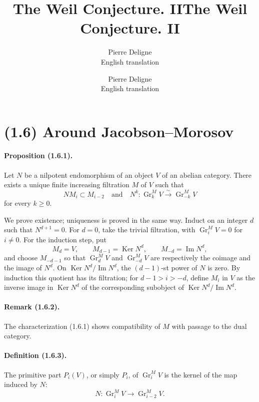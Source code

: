 \documentclass[11pt]{article}
\title{The Weil Conjecture. II}
\author{Pierre Deligne\\\small English translation}
\date{}
\theoremstyle{remark}
\newcommand{\Gr}{\operatorname{Gr}}
\newcommand{\Ker}{\operatorname{Ker}}
\begin{document}
\title{The Weil Conjecture. II}
\author{Pierre Deligne\\\small English translation}
\date{}\maketitle


\section*{(1.6) Around Jacobson--Morosov}

\paragraph{Proposition (1.6.1).} Let $N$ be a nilpotent endomorphism of an object $V$ of an abelian category. There exists a unique finite increasing filtration $M$ of $V$ such that
\[
        NM_i\subset M_{i-2}
        \quad\text{and}\quad
        N^k: \Gr^M_k V \xrightarrow{\sim} \Gr^M_{-k}V
\]
for every $k\ge0$.

We prove existence; uniqueness is proved in the same way. Induct on an integer $d$ such that $N^{d+1}=0$. For $d=0$, take the trivial filtration, with $\Gr^M_iV=0$ for $i\ne0$. For the induction step, put
\[
M_d=V,\qquad M_{d-1}=\Ker N^d,\qquad M_{-d}=\operatorname{Im}N^d,
\]
and choose $M_{-d-1}$ so that $\Gr^M_dV$ and $\Gr^M_{-d}V$ are respectively the coimage and the image of $N^d$. On $\Ker N^d/\operatorname{Im}N^d$, the $(d-1)$-st power of $N$ is zero. By induction this quotient has its filtration; for $d-1>i>-d$, define $M_i$ in $V$ as the inverse image in $\Ker N^d$ of the corresponding subobject of $\Ker N^d/\operatorname{Im}N^d$.

\paragraph{Remark (1.6.2).} The characterization (1.6.1) shows compatibility of $M$ with passage to the dual category.

\paragraph{Definition (1.6.3).} The primitive part $P_i(V)$, or simply $P_i$, of $\Gr^M_iV$ is the kernel of the map induced by $N$:
\[
        N:\Gr^M_iV\longrightarrow \Gr^M_{i-2}V.
\]
\end{document}
